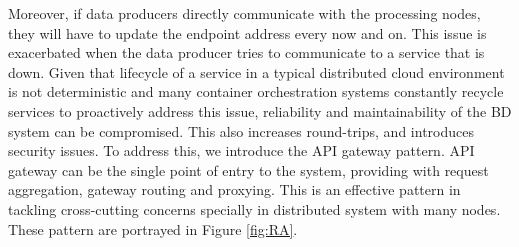 \documentclass[a4paper,11pt,article,oneside]{memoir}
\begin{document}


Moreover, if data producers directly communicate with the processing nodes, they will have to update the endpoint address every now and on. This issue is exacerbated when the data producer tries to communicate to a service that is down. Given that lifecycle of a service in a typical distributed cloud environment is not deterministic and many container orchestration systems constantly recycle services to proactively address this issue, reliability and maintainability of the BD system can be compromised. This also increases round-trips, and introduces security issues. To address this, we introduce the API gateway pattern. API gateway can be the single point of entry to the system, providing with request aggregation, gateway routing and proxying. This is an effective pattern in tackling cross-cutting concerns specially in distributed system with many nodes. These pattern are portrayed in Figure \ref{fig:RA}. 





\end{document}
